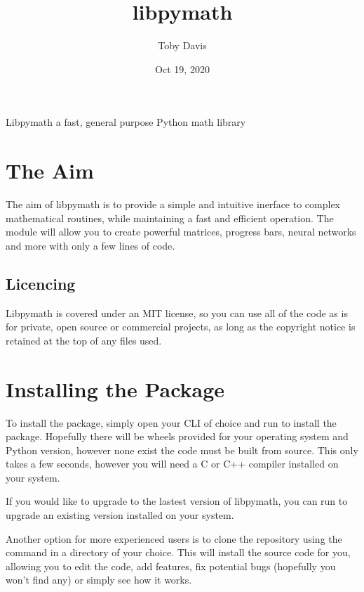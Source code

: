 \documentclass[letterpaper,10pt,english]{sphinxmanual}
\title{libpymath}
\date{Oct 19, 2020}
\author{Toby Davis}
\begin{document}
\pagestyle{empty}
\sphinxmaketitle
\pagestyle{plain}
\sphinxtableofcontents
\pagestyle{normal}
\label{\detokenize{index::doc}}


Libpymath \sphinxhyphen{} a fast, general purpose Python math library


\chapter{The Aim}
\label{\detokenize{index:the-aim}}
The aim of libpymath is to provide a simple and intuitive inerface to complex mathematical routines, while maintaining a fast and efficient operation. The module will allow you to create powerful matrices, progress bars, neural networks and more with only a few lines of code.


\section{Licencing}
\label{\detokenize{index:licencing}}
Libpymath is covered under an MIT license, so you can use all of the code as is for private, open source or commercial projects, as long as the copyright notice is retained at the top of any files used.


\chapter{Installing the Package}
\label{\detokenize{index:installing-the-package}}
To install the package, simply open your CLI of choice and run  to install the package. Hopefully there will be wheels provided for your operating system and Python version, however none exist the code must be built from source. This only takes a few seconds, however you will need a C or C++ compiler installed on your system.

If you would like to upgrade to the lastest version of libpymath, you can run  to upgrade an existing version installed on your system.

Another option for more experienced users is to clone the repository using the  command in a directory of your choice. This will install the source code for you, allowing you to edit the code, add features, fix potential bugs (hopefully you won’t find any) or simply see how it works.
\end{document}
